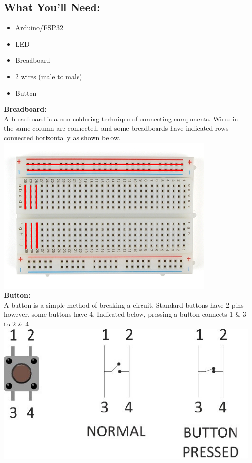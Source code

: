 \documentclass[a4paper,12pt]{report}
\begin{document}
    \subsection*{What You'll Need:}
        \begin{itemize}
            \item Arduino/ESP32
            \item LED
            \item Breadboard
            \item 2 wires (male to male)
            \item Button
        \end{itemize}
        \begin{mdframed}[linewidth = 3, linecolor = turbo_purple]
            \textbf{Breadboard:} \\
            A breadboard is a non-soldering technique of connecting components. Wires in the same column are connected, and some breadboards have indicated rows connected horizontally as shown below. \\
            \includegraphics[scale = 0.7]{Assets/breadboard.png} \\
            \textbf{Button:} \\
            A button is a simple method of breaking a circuit. Standard buttons have 2 pins however, some buttons have 4. Indicated below, pressing a button connects 1 \& 3 to 2 \& 4. \\
            \includegraphics[scale = 1]{Assets/button.jpg}
        \end{mdframed}
\newpage
\end{document}

